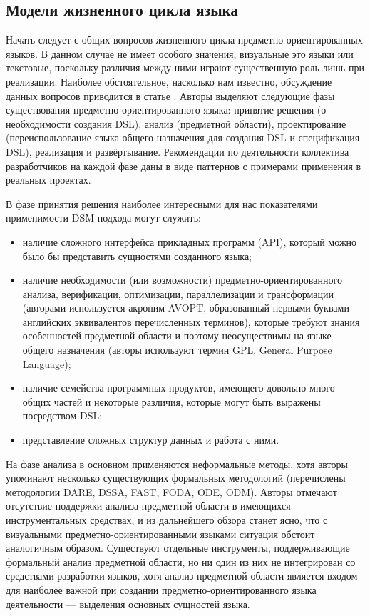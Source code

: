 \subsection{Модели жизненного цикла языка}
\label{lifecycleModels}
Начать следует с общих вопросов жизненного цикла предметно-ориентированных языков.
В данном случае не имеет особого значения, визуальные это языки или текстовые, поскольку
различия между ними играют существенную роль лишь при реализации. Наиболее обстоятельное,
насколько нам известно, обсуждение данных вопросов приводится в статье \cite{mernik2005and}. 
Авторы выделяют следующие фазы существования предметно-ориентированного языка: принятие 
решения (о необходимости создания DSL), анализ (предметной области), проектирование 
(переиспользование языка общего назначения для создания DSL и спецификация DSL), реализация 
и развёртывание. Рекомендации по деятельности коллектива разработчиков на каждой фазе 
даны в виде паттернов с примерами применения в реальных проектах. 

В фазе принятия решения наиболее интересными для нас показателями применимости DSM-подхода могут служить: 
\begin{itemize}
	\item наличие сложного интерфейса прикладных программ (API), который можно было 
		бы представить сущностями созданного языка;
	\item наличие необходимости (или возможности) предметно-ориентированного анализа, 
		верификации, оптимизации, параллелизации и трансформации (авторами используется 
		акроним AVOPT, образованный первыми буквами английских эквивалентов перечисленных 
		терминов), которые требуют знания особенностей предметной области и поэтому неосуществимы 
		на языке общего назначения (авторы используют термин GPL, General Purpose Language);
	\item наличие семейства программных продуктов, имеющего довольно много общих частей 
		и некоторые различия, которые могут быть выражены посредством DSL;
	\item представление сложных структур данных и работа с ними.
\end{itemize}

На фазе анализа в основном применяются неформальные методы, хотя авторы упоминают 
несколько существующих формальных методологий (перечислены методологии
DARE, DSSA, FAST, FODA, ODE, ODM). Авторы отмечают отсутствие поддержки анализа предметной 
области в имеющихся инструментальных средствах, и из дальнейшего обзора станет ясно, 
что с визуальными предметно-ориентированными языками ситуация обстоит аналогичным 
образом. Существуют отдельные инструменты, поддерживающие формальный анализ предметной 
области, но ни один из них не интегрирован со средствами разработки языков, хотя анализ 
предметной области является входом для наиболее важной при создании предметно-ориентированного 
языка деятельности –-- выделения основных сущностей языка.

